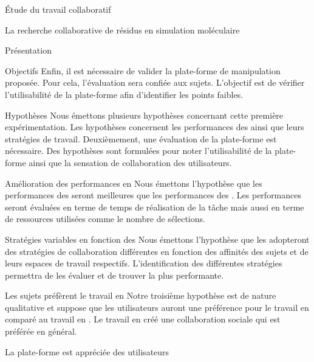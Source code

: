\documentclass[myfrancais]{mythesis}
\begin{document}
\begin{mypart}{Étude du travail collaboratif}
\begin{mychapter}{La recherche collaborative de résidus en simulation moléculaire}
\begin{mysection}{Présentation}
\begin{mysubsection}{Objectifs}
					Enfin, il est nécessaire de valider la plate-forme de manipulation proposée.
					Pour cela, l'évaluation sera confiée aux sujets.
					L'objectif est de vérifier l'utilisabilité de la plate-forme afin d'identifier les points faibles.
				\end{mysubsection}
				\begin{mysubsection}{Hypothèses}
					Nous émettons plusieurs hypothèses concernant cette première expérimentation.
					Les hypothèses concernent les performances des  ainsi que leurs stratégies de travail.
					Deuxièmement, une évaluation de la plate-forme est nécessaire.
					Des hypothèses sont formulées pour noter l'utilisabilité de la plate-forme ainsi que la sensation de collaboration des utilisateurs.
					\begin{myparagraph}{ Amélioration des performances en }
						Nous émettons l'hypothèse que les performances des  seront meilleures que les performances des .
						Les performances seront évaluées en terme de temps de réalisation de la tâche mais aussi en terme de ressources utilisées comme le nombre de sélections.
					\end{myparagraph}
					\begin{myparagraph}{ Stratégies variables en fonction des }
						Nous émettons l'hypothèse que les  adopteront des stratégies de collaboration différentes en fonction des affinités des sujets et de leurs espaces de travail respectifs.
						L'identification des différentes stratégies permettra de les évaluer et de trouver la plus performante.
					\end{myparagraph}
					\begin{myparagraph}{ Les sujets préfèrent le travail en }
						Notre troisième hypothèse est de nature qualitative et suppose que les utilisateurs auront une préférence pour le travail en  comparé au travail en .
						Le travail en  créé une collaboration sociale qui est préférée en général.
					\end{myparagraph}
					\begin{myparagraph}{ La plate-forme est appréciée des utilisateurs}

\end{myparagraph}
\end{mysubsection}
\end{mysection}
\end{mychapter}
\end{mypart}
\end{document}
